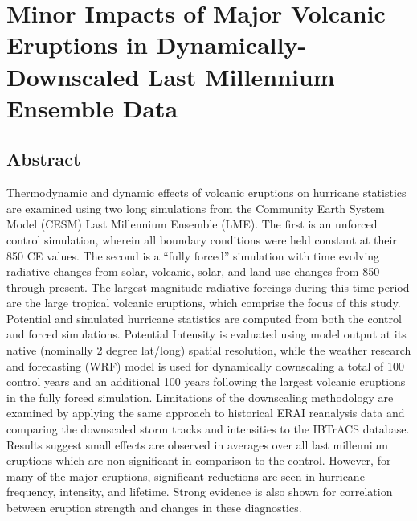 \documentclass[phd,tocprelim]{cornell}
\begin{document}


\chapter{Minor Impacts of Major Volcanic Eruptions in
  Dynamically-Downscaled Last Millennium Ensemble Data}\label{chap:vol}

\section{Abstract}
  Thermodynamic and dynamic effects of volcanic eruptions on hurricane
  statistics are examined using two long simulations from the
  Community Earth System Model (CESM) Last Millennium Ensemble
  (LME). The first is an unforced control simulation, wherein all
  boundary conditions were held constant at their 850 CE values. The
  second is a ``fully forced'' simulation with time evolving radiative
  changes from solar, volcanic, solar, and land use changes from 850
  through present. The largest magnitude radiative forcings during
  this time period are the large tropical volcanic eruptions, which
  comprise the focus of this study. Potential and simulated hurricane
  statistics are computed from both the control and forced
  simulations. Potential Intensity is evaluated using model output at
  its native (nominally 2 degree lat/long) spatial resolution, while
  the weather research and forecasting (WRF) model is used for
  dynamically downscaling a total of 100 control years and an
  additional 100 years following the largest volcanic eruptions in the
  fully forced simulation.  Limitations of the downscaling methodology
  are examined by applying the same approach to historical ERAI
  reanalysis data and comparing the downscaled storm tracks and
  intensities to the IBTrACS database. Results suggest small effects
  are observed in averages over all last millennium eruptions which
  are non-significant in comparison to the control. However, for many
  of the major eruptions, significant reductions are seen in hurricane
  frequency, intensity, and lifetime. Strong evidence is also shown
  for correlation between eruption strength and changes in these
  diagnostics.
\end{document}

